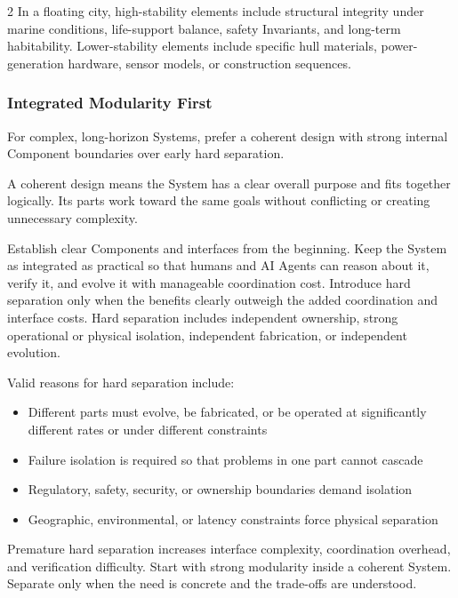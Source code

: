 \begin{multicols}{2}
In a floating city, high-stability elements include structural integrity under marine conditions, life-support balance, safety Invariants, and long-term habitability. Lower-stability elements include specific hull materials, power-generation hardware, sensor models, or construction sequences.

\hypertarget{gp-IMF}{}

\subsubsection*{Integrated Modularity First}

For complex, long-horizon Systems, prefer a coherent design with strong internal Component boundaries over early hard separation.

A coherent design means the System has a clear overall purpose and fits together logically. Its parts work toward the same goals without conflicting or creating unnecessary complexity.

Establish clear Components and interfaces from the beginning. Keep the System as integrated as practical so that humans and AI Agents can reason about it, verify it, and evolve it with manageable coordination cost. Introduce hard separation only when the benefits clearly outweigh the added coordination and interface costs. Hard separation includes independent ownership, strong operational or physical isolation, independent fabrication, or independent evolution.

Valid reasons for hard separation include:

\begin{itemize}\setlength{\itemsep}{0pt}\setlength{\parskip}{0pt}

\item Different parts must evolve, be fabricated, or be operated at significantly different rates or under different constraints

\item Failure isolation is required so that problems in one part cannot cascade

\item Regulatory, safety, security, or ownership boundaries demand isolation

\item Geographic, environmental, or latency constraints force physical separation

\end{itemize}

Premature hard separation increases interface complexity, coordination overhead, and verification difficulty. Start with strong modularity inside a coherent System. Separate only when the need is concrete and the trade-offs are understood.


\end{multicols}
